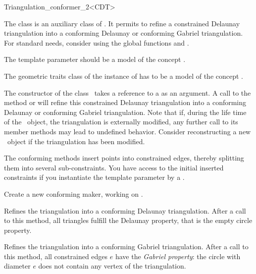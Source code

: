 \begin{ccRefClass}{Triangulation_conformer_2<CDT>}

The class \ccRefName{} is an auxiliary class of
. It permits to refine a constrained
Delaunay triangulation into a conforming Delaunay or conforming
Gabriel triangulation. For standard needs, consider using the global
functions  and
.

\ccParameters 

The template parameter  should be a model of the concept
.

The geometric traits class of the instance of  has to be
a model of the concept .


The constructor of the class \ccRefName\ takes a reference to a 
as an argument. A call to the method  or
 will refine this constrained Delaunay
triangulation into a conforming Delaunay or conforming Gabriel
triangulation. Note that if, during the life time of the \ccRefName\
object, the triangulation is externally modified, any further call to its
member methods may lead to undefined behavior. Consider reconstructing a
new \ccRefName\ object if the triangulation has been modified.

The conforming methods insert points into constrained edges, thereby splitting
them into several sub-constraints. You have access to the initial inserted
constraints if you instantiate the template parameter by a
.


\ccCreation
{}

{Create a new conforming maker, working on .}

\ccOperations


{ Refines the triangulation into a conforming Delaunay triangulation.
  After a call to this method, all triangles fulfill the Delaunay property,
  that is the empty circle
  property. }

{ Refines the triangulation into a conforming Gabriel triangulation.
  After a call to this method, all constrained edges $e$ have the
  \emph{Gabriel property}: the circle with diameter $e$ 
  does not contain any vertex of the triangulation. }


\end{ccRefClass}
